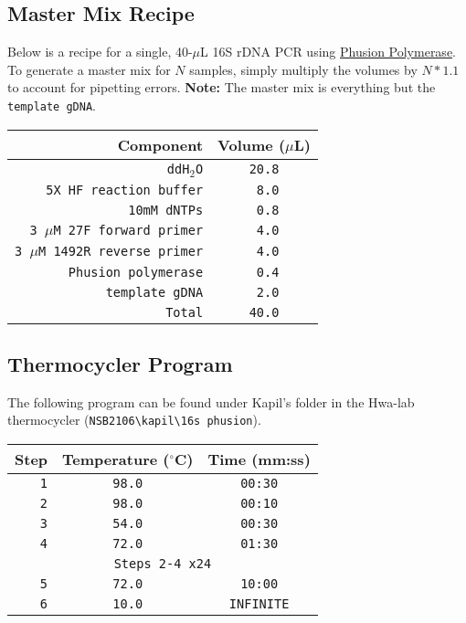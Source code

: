 \documentclass[twocolumn]{article}
\begin{document}
\subsection{Master Mix Recipe}
Below is a recipe for a single,
40-$\mu$L 16S rDNA PCR using \href{https://www.neb.com/protocols/0001/01/01/pcr-protocol-m0530}{Phusion Polymerase}.
To generate a master mix for $N$ samples,
simply multiply the volumes by $N*1.1$ to account for pipetting errors.
\textbf{Note:} The master mix is everything but the \texttt{template gDNA}.
\begin{table}[h]
  \begin{tabular}{|r|c|}
    \hline
    \textbf{Component} & \textbf{Volume ($\mu$L)} \\
    \hline
    \texttt{ddH$_2$O} & \texttt{20.8} \\
    \hline
    \texttt{5X HF reaction buffer} & \texttt{ 8.0} \\
    \hline
    \texttt{10mM dNTPs} & \texttt{ 0.8}\\
    \hline
    \texttt{3 $\mu$M 27F forward primer} & \texttt{ 4.0} \\
    \hline
    \texttt{3 $\mu$M 1492R reverse primer} & \texttt{ 4.0} \\
    \hline
    \texttt{Phusion polymerase} & \texttt{ 0.4} \\
    \hline
    \texttt{template gDNA} & \texttt{ 2.0} \\
    \hline
    \texttt{Total} & \texttt{40.0} \\
    \hline
  \end{tabular}
  \label{tab:PCR_MM}
\end{table}

\subsection{Thermocycler Program}
The following program can be found under Kapil's folder in the Hwa-lab thermocycler
(\texttt{NSB2106\textbackslash kapil\textbackslash 16s phusion}).
\begin{table}[h]
  \begin{tabular}{|r|c|c|}
    \hline
    \textbf{Step} & \textbf{Temperature ($^\circ$C)} & \textbf{Time (mm:ss)}\\
    \hline
    \texttt{1} & \texttt{98.0} & \texttt{00:30}\\
    \hline
    \texttt{2} & \texttt{98.0} & \texttt{00:10}\\
    \hline
    \texttt{3} & \texttt{54.0} & \texttt{00:30}\\
    \hline
    \texttt{4} & \texttt{72.0} & \texttt{01:30}\\
    \hline
    \multicolumn{3}{|c|}{\texttt{Steps 2-4 x24}}\\
    \hline
    \texttt{5} & \texttt{72.0} & \texttt{10:00}\\
    \hline
    \texttt{6} & \texttt{10.0} & \texttt{INFINITE}\\
    \hline
  \end{tabular}
  \label{tab:PCR_prog}
\end{table}
\end{document}
